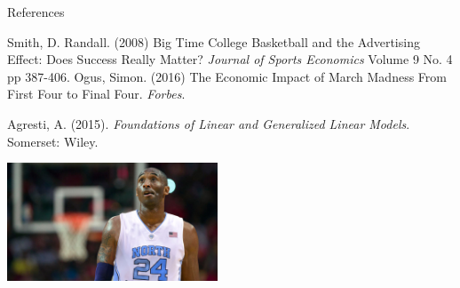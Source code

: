 \documentclass{beamer}
\begin{document}
\begin{frame}{References}
\begin{thebibliography}{4}
Smith, D. Randall. (2008) Big Time College Basketball and the Advertising Effect: Does Success Really Matter? \textit{Journal of Sports Economics} Volume 9 No. 4 pp 387-406.
Ogus, Simon. (2016) The Economic Impact of March Madness From First Four to Final Four. \textit{Forbes}. 

Agresti, A. (2015). \textit{Foundations of Linear and Generalized Linear Models}. Somerset: Wiley.
\end{thebibliography}
\centering
\includegraphics[height=100pt]{fakekobe2.jpg}

\end{frame}
	
\end{document}
